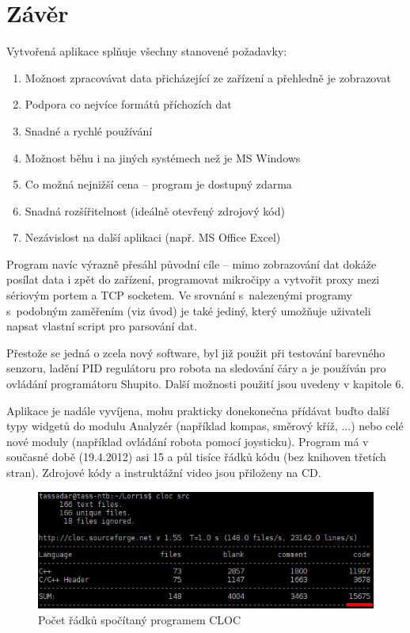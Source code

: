 \documentclass[12pt, a4paper, oneside]{article}
\newcommand{\Has}{\textcolor{green}{\CheckmarkBold}}
\begin{document}
\newpage
\section*{Závěr}
Vytvořená aplikace splňuje všechny stanovené požadavky:
\begin{enumerate}[label=\Has\hspace{1.5mm}\arabic{*}.]
    \item Možnost zpracovávat data přicházející ze zařízení a přehledně je zobrazovat%
    \item Podpora co nejvíce formátů příchozích dat%
    \item Snadné a rychlé používání %
    \item Možnost běhu i na jiných systémech než je MS Windows %
    \item Co možná nejnižší cena -- program je dostupný zdarma%
    \item Snadná rozšířitelnost (ideálně otevřený zdrojový kód) %
    \item Nezávislost na další aplikaci (např. MS Office Excel) %
\end{enumerate}
Program navíc výrazně přesáhl původní cíle -- mimo zobrazování dat dokáže posílat data i zpět do zařízení, programovat mikročipy a vytvořit proxy mezi sériovým portem a TCP socketem. Ve srovnání s~nalezenými programy s~podobným zaměřením (viz úvod) je také jediný, který umožňuje uživateli napsat vlastní script pro parsování dat.

Přestože se jedná o zcela nový software, byl již použit při testování barevného senzoru, ladění PID regulátoru pro robota na sledování čáry a je používán pro ovládání programátoru Shupito. Další možnosti použití jsou uvedeny v kapitole 6.

Aplikace je nadále vyvíjena, mohu prakticky donekonečna přídávat buďto další typy widgetů do modulu Analyzér (například kompas, směrový kříž, ...) nebo celé nové moduly (například ovládání robota pomocí joysticku). Program má v současné době (19.4.2012) asi 15 a půl tisíce řádků kódu (bez knihoven třetích stran). Zdrojové kódy a instruktážní video jsou přiloženy na CD. 
\begin{figure}[H]
\begin{center}
\includegraphics[width=\textwidth]{img/cloc_edit.png}
\caption{Počet řádků spočítaný programem CLOC\cite{cloc}}
\end{center}
\end{figure}
\end{document}
